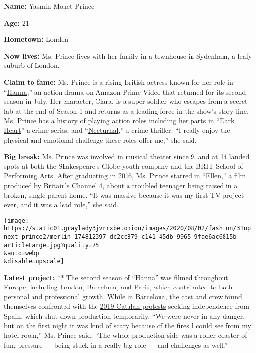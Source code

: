 \textbf{Name:} Yasmin Monet Prince

\textbf{Age:} 21

\textbf{Hometown:} London

\textbf{Now lives:} Ms. Prince lives with her family in a townhouse in
Sydenham, a leafy suburb of London.

\textbf{Claim to fame:} Ms. Prince is a rising British actress known for
her role in
``\href{https://www.amazon.com/Hanna-Season-2/dp/B087C8X5V2}{Hanna},''
an action drama on Amazon Prime Video that returned for its second
season in July. Her character, Clara, is a super-soldier who escapes
from a secret lab at the end of Season 1 and returns as a leading force
in the show's story line. Ms. Prince has a history of playing action
roles including her parts in
``\href{https://www.amazon.com/Dark-Heart-Season-1/dp/B07K2KH636}{Dark
Heart}'' a crime series, and
``\href{https://www.amazon.com/Nocturnal-Lashonda-Jones/dp/B07YX84F8M}{Nocturnal},''
a crime thriller. ``I really enjoy the physical and emotional challenge
these roles offer me,'' she said.

\textbf{Big break:} Ms. Prince was involved in musical theater since 9,
and at 14 landed spots at both the Shakespeare's Globe youth company and
the BRIT School of Performing Arts. After graduating in 2016, Ms. Prince
starred in ``\href{https://www.imdb.com/title/tt5959320/}{Ellen},'' a
film produced by Britain's Channel 4, about a troubled teenager being
raised in a broken, single-parent home. ``It was massive because it was
my first TV project ever, and it was a lead role,'' she said.

\texttt{[image: https://static01.graylady3jvrrxbe.onion/images/2020/08/02/fashion/31upnext-prince2/merlin\_174812397\_dc2cc879-c141-45db-9965-9fae6ac6815b-articleLarge.jpg?quality=75\\\&auto=webp\\\&disable=upscale]}

\textbf{Latest project:} ** The second season of ``Hanna'' was filmed
throughout Europe, including London, Barcelona, and Paris, which
contributed to both personal and professional growth. While in
Barcelona, the cast and crew found themselves confronted with the
\href{https://www.nytimes3xbfgragh.onion/2019/09/11/world/europe/spain-catalonia-independence.html}{2019
Catalan protests} seeking independence from Spain, which shut down
production temporarily. ``We were never in any danger, but on the first
night it was kind of scary because of the fires I could see from my
hotel room,'' Ms. Prince said. ``The whole production side was a roller
coaster of fun, pressure --- being stuck in a really big role --- and
challenges as well.''

